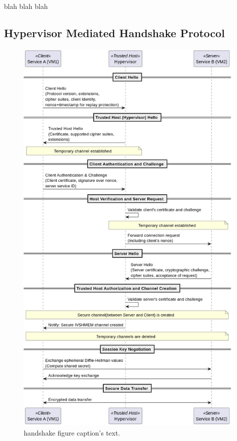 \documentclass[letterpaper,twocolumn,10pt]{article}
\begin{document}
blah blah blah


\subsection{Hypervisor Mediated Handshake Protocol}




\begin{figure}[ht]
\begin{center}
  \includegraphics[width=0.95\linewidth]{./figures/ivshmem_handshake.png}
\end{center}
\caption{\label{fig:handshake} handshake figure 
  caption's text. }
\end{figure}
\end{document}
